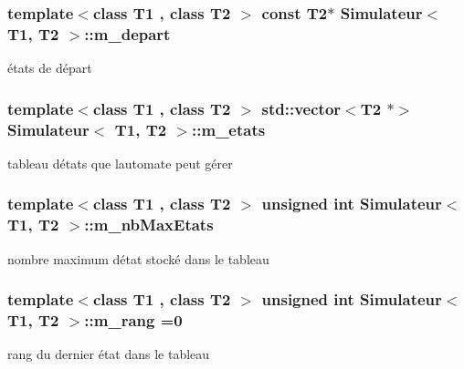 \subsubsection[{\texorpdfstring{m\+\_\+depart}{m_depart}}]{\setlength{\rightskip}{0pt plus 5cm}template$<$class T1 , class T2 $>$ const T2$\ast$ {\bf Simulateur}$<$ T1, T2 $>$\+::m\+\_\+depart\hspace{0.3cm}{\ttfamily [private]}}\hypertarget{class_simulateur_a8f024dcb44d5688aac1fdbc7df531104}{}\label{class_simulateur_a8f024dcb44d5688aac1fdbc7df531104}
états de départ 
\subsubsection[{\texorpdfstring{m\+\_\+etats}{m_etats}}]{\setlength{\rightskip}{0pt plus 5cm}template$<$class T1 , class T2 $>$ std\+::vector$<$T2 $\ast$$>$ {\bf Simulateur}$<$ T1, T2 $>$\+::m\+\_\+etats\hspace{0.3cm}{\ttfamily [private]}}\hypertarget{class_simulateur_a9156b165b5affe1b4627ff66802cfc99}{}\label{class_simulateur_a9156b165b5affe1b4627ff66802cfc99}
tableau d\textquotesingle{}états que l\textquotesingle{}automate peut gérer 
\subsubsection[{\texorpdfstring{m\+\_\+nb\+Max\+Etats}{m_nbMaxEtats}}]{\setlength{\rightskip}{0pt plus 5cm}template$<$class T1 , class T2 $>$ unsigned int {\bf Simulateur}$<$ T1, T2 $>$\+::m\+\_\+nb\+Max\+Etats\hspace{0.3cm}{\ttfamily [private]}}\hypertarget{class_simulateur_aee6fbe615a412a23aafe23d5b6487eec}{}\label{class_simulateur_aee6fbe615a412a23aafe23d5b6487eec}
nombre maximum d\textquotesingle{}état stocké dans le tableau 
\subsubsection[{\texorpdfstring{m\+\_\+rang}{m_rang}}]{\setlength{\rightskip}{0pt plus 5cm}template$<$class T1 , class T2 $>$ unsigned int {\bf Simulateur}$<$ T1, T2 $>$\+::m\+\_\+rang =0\hspace{0.3cm}{\ttfamily [private]}}\hypertarget{class_simulateur_a40f39f55c107779de9c1b4418b98f7c0}{}\label{class_simulateur_a40f39f55c107779de9c1b4418b98f7c0}
rang du dernier état dans le tableau 

